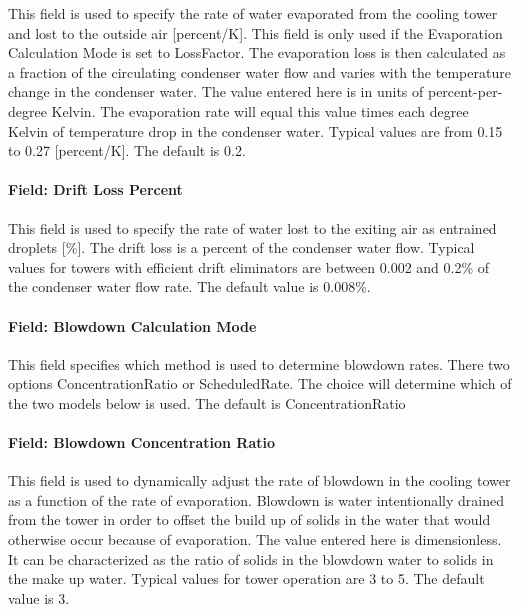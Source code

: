 This field is used to specify the rate of water evaporated from the cooling tower and lost to the outside air {[}percent/K{]}. This field is only used if the Evaporation Calculation Mode is set to LossFactor. The evaporation loss is then calculated as a fraction of the circulating condenser water flow and varies with the temperature change in the condenser water. The value entered here is in units of percent-per-degree Kelvin. The evaporation rate will equal this value times each degree Kelvin of temperature drop in the condenser water. Typical values are from 0.15 to 0.27 {[}percent/K{]}. The default is 0.2.

\paragraph{Field: Drift Loss Percent}\label{field-drift-loss-percent-1}

This field is used to specify the rate of water lost to the exiting air as entrained droplets {[}\%{]}. The drift loss is a percent of the condenser water flow. Typical values for towers with efficient drift eliminators are between 0.002 and 0.2\% of the condenser water flow rate. The default value is 0.008\%.

\paragraph{Field: Blowdown Calculation Mode}\label{field-blowdown-calculation-mode-1}

This field specifies which method is used to determine blowdown rates. There two options ConcentrationRatio or ScheduledRate. The choice will determine which of the two models below is used. The default is ConcentrationRatio

\paragraph{Field: Blowdown Concentration Ratio}\label{field-blowdown-concentration-ratio-1}

This field is used to dynamically adjust the rate of blowdown in the cooling tower as a function of the rate of evaporation. Blowdown is water intentionally drained from the tower in order to offset the build up of solids in the water that would otherwise occur because of evaporation. The value entered here is dimensionless. It can be characterized as the ratio of solids in the blowdown water to solids in the make up water. Typical values for tower operation are 3 to 5. The default value is 3.

